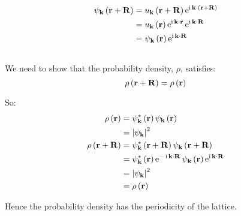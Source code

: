 \subsection{}
\begin{align*}
    \psi_{\mathbf{k}} \del{\mathbf{r} + \mathbf{R}} & = u_{\mathbf{k}} \del{\mathbf{r} + \mathbf{R}} \operatorname{e}^{\operatorname{i} \mathbf{k} \cdot \del{\mathbf{r} + \mathbf{R}}}\\
    & = u_{\mathbf{k}} \del{\mathbf{r}} \operatorname{e}^{\operatorname{i} \mathbf{k} \cdot \mathbf{r}} \operatorname{e}^{\operatorname{i} \mathbf{k} \cdot \mathbf{R}}\\
    & = \psi_{\mathbf{k}} \del{\mathbf{r}} \operatorname{e}^{\operatorname{i} \mathbf{k} \cdot \mathbf{R}}
\end{align*}

\subsection{}
We need to show that the probability density, $ \rho $, satisfies:
\begin{equation*}
    \rho \del{\mathbf{r} + \mathbf{R}} = \rho \del{\mathbf{r}}
\end{equation*}

So:
\begin{align*}
    \rho \del{\mathbf{r}} & = \psi_{\mathbf{k}}^* \del{\mathbf{r}} \psi_{\mathbf{k}} \del{\mathbf{r}}\\
    & = \abs{\psi_{\mathbf{k}}}^2\\
    \rho \del{\mathbf{r} + \mathbf{R}} & = \psi_{\mathbf{k}}^* \del{\mathbf{r} + \mathbf{R}} \psi_{\mathbf{k}} \del{\mathbf{r} + \mathbf{R}}\\
    & = \psi_{\mathbf{k}}^* \del{\mathbf{r}} \operatorname{e}^{- \operatorname{i} \mathbf{k} \cdot \mathbf{R}} \psi_{\mathbf{k}} \del{\mathbf{r}} \operatorname{e}^{\operatorname{i} \mathbf{k} \cdot \mathbf{R}}\\
    & = \abs{\psi_{\mathbf{k}}}^2\\
    & = \rho \del{\mathbf{r}}
\end{align*}

Hence the probability density has the periodicity of the lattice.
